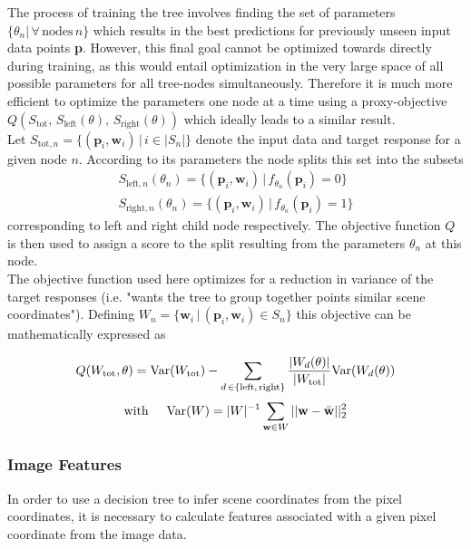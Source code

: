 \documentclass[final]{cvpr}
\begin{document}
The process of training the tree involves finding the set of parameters
$\{\theta_n | \, \forall \, \text{nodes} \, n\}$ which results in the best predictions
for previously unseen input data points \textbf{p}. However, this final goal cannot
be optimized towards directly during training, as this would entail optimization in the
very large space of all possible parameters for all tree-nodes simultaneously. Therefore
it is much more efficient to optimize the parameters one node at a time using a
proxy-objective $Q(S_{\text{tot}},\, S_{\text{left}}(\theta),\, S_{\text{right}}(\theta))$
which ideally leads to a similar result.\\

Let $S_{\text{tot},n} = \{ (\textbf{p}_i, \textbf{w}_i) \, | \, i \in |S_n|\}$ denote the
input data and target response for a given node $n$. According to its parameters the
node splits this set into the subsets
\begin{equation}
\begin{split}
	S_{\text{left},n}(\theta_n) = \{(\textbf{p}_i, \textbf{w}_i) \,|\, f_{\theta_n}(\textbf{p}_i) = 0\} \\
	S_{\text{right},n}(\theta_n) = \{(\textbf{p}_i, \textbf{w}_i) \,|\, f_{\theta_n}(\textbf{p}_i) = 1\}
\end{split}
\end{equation}
corresponding to left and right child node respectively. The objective function $Q$ is
then used to assign a score to the split resulting from the parameters $\theta_n$ at
this node.\\

The objective function used here optimizes for a reduction in variance of the target 
responses (i.e. "wants the tree to group together points similar scene coordinates").
Defining $W_n = \{ \textbf{w}_i \, | \, (\textbf{p}_i, \textbf{w}_i) \in S_n \}$ this
objective can be mathematically expressed as

\begin{equation}
	Q(W_\text{tot}, \theta) =
		\text{Var}(W_\text{tot}) - \sum_{d\,\in\{\text{left,\,right}\}}
			\dfrac{|W_d(\theta)|}{|W_\text{tot}|} \text{Var}(W_d(\theta))
\end{equation}
\begin{equation}
	\text{with} \hspace{5mm} \text{Var}(W) = |W|^{-1} \sum_{\textbf{w}\in W} ||\textbf{w} - \bar{\textbf{w}}||_2^2
\end{equation}


\subsubsection{Image Features}
In order to use a decision tree to infer scene coordinates from the pixel coordinates,
it is necessary to calculate features associated with a given pixel coordinate from the
image data. 
\end{document}
